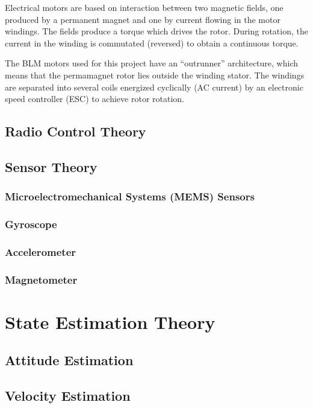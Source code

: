 \documentclass[a4paper]{report}
\begin{document}
Electrical motors are based on interaction between two magnetic fields, one produced by a permanent magnet and one by current flowing in the motor windings. The fields produce a torque which drives the rotor. During rotation, the current in the winding is commutated (reversed) to obtain a continuous torque.

The BLM motors used for this project have an “outrunner” architecture, which means that the permamagnet rotor lies outside the winding stator. The windings are separated into several coils energized cyclically (AC current) by an electronic speed controller (ESC) to achieve rotor rotation.

	\section{Radio Control Theory}

	\section{Sensor Theory}
		
		\subsection{Microelectromechanical Systems (MEMS) Sensors}

		\subsection{Gyroscope}

		\subsection{Accelerometer}

		\subsection{Magnetometer}

\chapter{State Estimation Theory}

	\section{Attitude Estimation}

	\section{Velocity Estimation}
\end{document}
